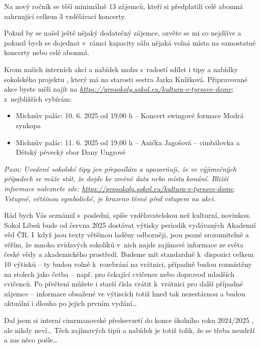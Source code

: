 \documentclass[11pt]{article}
\begin{document}
Na nový ročník se těší minimálně 13 zájemců, kteří si předplatili celé
abonmá zahrnující celkem 3 vzdělávací koncerty.

Pokud by se našel ještě nějaký dodatečný zájemce, ozvěte se mi co
nejdříve a pokusil bych se dojednat v~rámci kapacity sálu nějaká volná
místa na samostatné koncerty nebo celé abonmá.

Krom našich interních akcí a nabídek
mohu s~radostí sdílet i tipy a nabídky sokolského projektu , který má na starosti sestra Jarka Knížková. Připravované
akce byste měli najít na
\href{https://prosokoly.sokol.eu/kultura-v-tyrsove-dome}{\emph{https://prosokoly.sokol.eu/kultura-v-tyrsove-dome}};
z~nejbližších vybírám:

\begin{itemize}[
  itemsep=-3pt,
  leftmargin=1em,
  itemindent=-1em
]
  \item[] Michnův palác: 10. 6. 2025 od 19,00 h – Koncert swingové formace Modrá synkopa
  \item[] Michnův palác: 11. 6. 2025 od 19,00 h – Anička Jagošová – cimbálovka a Dětský pěvecký sbor Dany Ungrové
\end{itemize}

\noindent
\emph{Pozn: Uvedené sokolské tipy jen přeposílám a upozorňuji, že ve
výjimečných případech se může stát, že dojde ke změně data nebo místa
konání. Bližší informace naleznete zde:
\href{https://prosokoly.sokol.eu/kultura-v-tyrsove-dome}{https://prosokoly.sokol.eu/kultura-v-tyrsove-dome}.
Vstupné, většinou symbolické, je hrazeno těsně před vstupem na akci.}

Rád bych Vás seznámil s~poslední,
spíše vzdělavatelskou než kulturní, novinkou. Sokol Libeň bude od června
2025 dostávat výtisky periodik vydávaných Akademií věd ČR. I~když jsou
texty většinou laděny odborněji, jsou psané srozumitelně a věřím, že
mnoho zvídavých sokolíků v~nich najde zajímavé informace ze světa
české vědy a akademického prostředí. Budeme mít standardně
k~dispozici celkem 10 výtisků -- ty budou volně k~rozebrání na vrátnici,
případně budou rozmístěny na stolech jako četba  --
např. pro čekající cvičence nebo doprovod mladších cvičenců. Po přečtení
můžete i starší čísla vrátit k~vrátnici pro další případné zájemce --
informace obsažené ve výtiscích totiž hned tak nezestárnou a budou
aktuální i dlouho po jejich prvním vydání\ldots{}

Dal jsem si interní cimrmanovské předsevzetí do konce školního roku
2024/2025 , ale  nikdy neví\ldots{}
Těch zajímavých tipů a nabídek je totiž tolik, že se třeba 
neudrží a zas něco pošle\ldots{}
\end{document}
